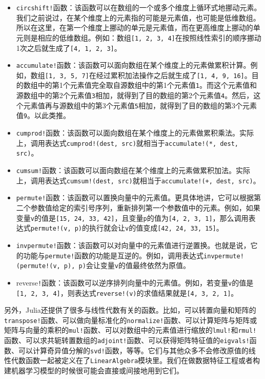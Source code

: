 \begin{itemize}
\item \verb|circshift!|函数：该函数可以在数组的一个或多个维度上循环式地挪动元素。我们之前说过，在某个维度上的元素指的可能是元素值，也可能是低维数组。所以在这里，在第一个维度上挪动的单元是元素值，而在更高维度上挪动的单元则是相应的低维数组。例如：数组\verb|[1, 2, 3, 4]|在按照线性索引的顺序挪动1次之后就生成了\verb|[4, 1, 2, 3]|。
\item \verb|accumulate!|函数：该函数可以面向数组在某个维度上的元素做累积计算。例如，数组\verb|[1, 3, 5, 7]|在经过累积加法操作之后就生成了\verb|[1, 4, 9, 16]|。目的数组中的第1个元素值完全取自源数组中的第1个元素值\verb|1|。而这个元素值和源数组中的第2个元素值\verb|3|相加，就得到了目的数组的第2个元素值\verb|4|。然后，这个元素值再与源数组中的第3个元素值\verb|5|相加，就得到了目的数组的第3个元素值\verb|9|。以此类推。
\item  \verb|cumprod!|函数：该函数可以面向数组在某个维度上的元素做累积乘法。实际上，调用表达式\verb|cumprod!(dest, src)|就相当于\verb|accumulate!(*, dest, src)|。
\item \verb|cumsum!|函数：该函数可以面向数组在某个维度上的元素做累积加法。实际上，调用表达式\verb|cumsum!(dest, src)|就相当于\verb|accumulate!(+, dest, src)|。
\item \verb|permute!|函数：该函数可以置换向量中的元素值。更具体地讲，它可以根据第二个参数值给定的索引号序列，重新排列第一个参数值中的元素。例如，如果变量\verb|v|的值是\verb|[15, 24, 33, 42]|，且变量\verb|p|的值为\verb|[4, 2, 3, 1]|，那么调用表达式\verb|permute!(v, p)|的执行就会让\verb|v|的值变成\verb|[42, 24, 33, 15]|。
\item \verb|invpermute!|函数：该函数可以对向量中的元素值进行逆置换。也就是说，它的功能与\verb|permute!|函数的功能是互逆的。例如，调用表达式\verb|invpermute!(permute!(v, p), p)|会让变量\verb|v|的值最终依然为原值。
\item reverse\verb|!|函数：该函数可以逆序排列向量中的元素值。例如，若变量\verb|v|的值是\verb|[1, 2, 3, 4]|，则表达式\verb|reverse!(v)|的求值结果就是\verb|[4, 3, 2, 1]|。
\end{itemize}

另外，Julia还提供了很多与线性代数有关的函数。比如，可以转置向量和矩阵的\verb|transpose!|函数、可以做向量标准化的\verb|normalize!|函数、可以计算矩阵与矩阵或矩阵与向量的乘积的\verb|mul!|函数、可以对数组中的元素值进行缩放的\verb|lmul!|和\verb|rmul!|函数、可以求共轭转置数组的\verb|adjoint!|函数、可以获得矩阵特征值的\verb|eigvals!|函数、可以计算奇异值分解的\verb|svd!|函数，等等。它们与其他众多不会修改原值的线性代数函数一起被定义在了\verb|LinearAlgebra|模块里。我们在做数据特征工程或者构建机器学习模型的时候很可能会直接或间接地用到它们。
